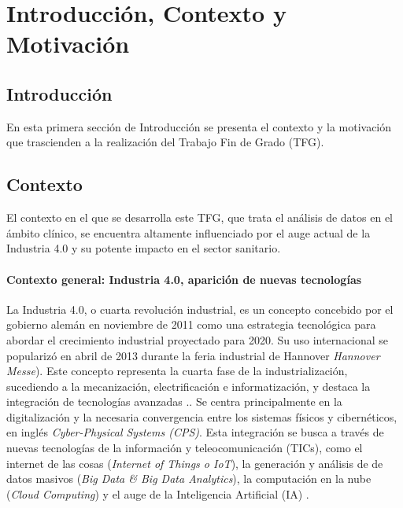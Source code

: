 \chapter{Introducción, Contexto y Motivación}\label{cap:introduccion}


\section{Introducción}


En esta primera sección de Introducción se presenta el contexto y la motivación que trascienden a la realización del Trabajo Fin de Grado (TFG).

\section{Contexto}
 
El contexto en el que se desarrolla este TFG, que trata el análisis de datos en el ámbito clínico, se encuentra altamente influenciado por el auge actual de la Industria 4.0 y su potente impacto en el sector sanitario.


\subsubsection{Contexto general: Industria 4.0, aparición de nuevas tecnologías}

La Industria 4.0, o cuarta revolución industrial, es un concepto concebido por el gobierno alemán en noviembre de 2011 como una estrategia tecnológica para abordar el crecimiento industrial proyectado para 2020. Su uso internacional se popularizó en abril de 2013 durante la feria industrial de Hannover \textit{Hannover Messe}). Este concepto representa la cuarta fase de la industrialización, sucediendo a la mecanización, electrificación e informatización, y destaca la integración de tecnologías avanzadas \cite{lasi2014industry}..
Se centra principalmente en la digitalización y la necesaria convergencia entre los sistemas físicos y cibernéticos, en inglés \textit{Cyber-Physical Systems (CPS)}. Esta integración se busca a través de nuevas tecnologías de la información y teleocomunicación (TICs), como el internet de las cosas (\textit{Internet of Things o IoT}), la generación y análisis de de datos masivos (\textit{Big Data \& Big Data Analytics}), la computación en la nube (\textit{Cloud Computing}) y el auge de la Inteligencia Artificial (IA) \cite{lasi2014industry}.\cite{chen2020times}\cite{tortorella2020healthcare}


